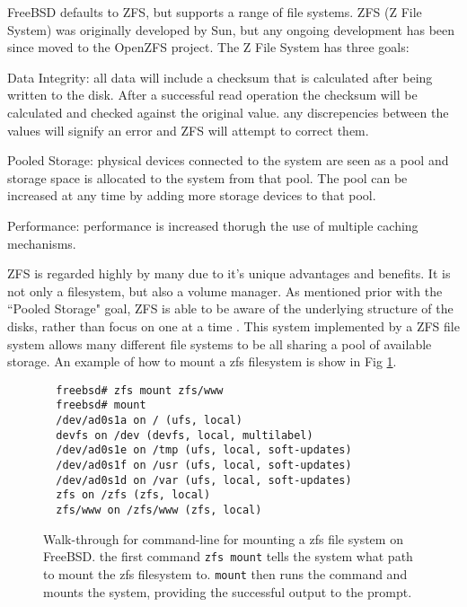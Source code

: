 \documentclass[10pt,draftclsnofoot,onecolumn]{IEEEtran}
\begin{document}
\par FreeBSD defaults to ZFS, but supports a range of file systems.
ZFS (Z File System) was originally developed by Sun, but any ongoing development has been since moved to the OpenZFS project.
The Z File System has three goals: \cite{bsd:2}
\begin{list}{*}{}
\item Data Integrity: all data will include a checksum that is calculated after being written to the disk.
After a successful read operation the checksum will be calculated and checked against the original value.
any discrepencies between the values will signify an error and ZFS will attempt to correct them.
\item Pooled Storage: physical devices connected to the system are seen as a pool and storage space is allocated to the system from that pool.
The pool can be increased at any time by adding more storage devices to that pool.
\item Performance: performance is increased thorugh the use of multiple caching mechanisms.
\end{list}

\par ZFS is regarded highly by many due to it's unique advantages and benefits.
It is not only a filesystem, but also a volume manager.
As mentioned prior with the ``Pooled Storage" goal, ZFS is able to be aware of the underlying structure of the disks, rather than focus on one at a time \cite{bsd:1}.
This system implemented by a ZFS file system allows many different file systems to be all sharing a pool of available storage.
An example of how to mount a zfs filesystem is show in Fig \ref{code:zfs-mount}.


\begin{figure}[h]
\begin{lstlisting}
  freebsd# zfs mount zfs/www
  freebsd# mount
  /dev/ad0s1a on / (ufs, local)
  devfs on /dev (devfs, local, multilabel)
  /dev/ad0s1e on /tmp (ufs, local, soft-updates)
  /dev/ad0s1f on /usr (ufs, local, soft-updates)
  /dev/ad0s1d on /var (ufs, local, soft-updates)
  zfs on /zfs (zfs, local)
  zfs/www on /zfs/www (zfs, local)
\end{lstlisting}
\centering
\captionsetup{justification=centering}
\caption{
  Walk-through for command-line for mounting a zfs file system on FreeBSD.
  the first command \texttt{zfs mount} tells the system what path to mount the zfs filesystem to.
  \texttt{mount} then runs the command and mounts the system, providing the successful output to the prompt.
}
\label{code:zfs-mount}
\end{figure}
\end{document}
